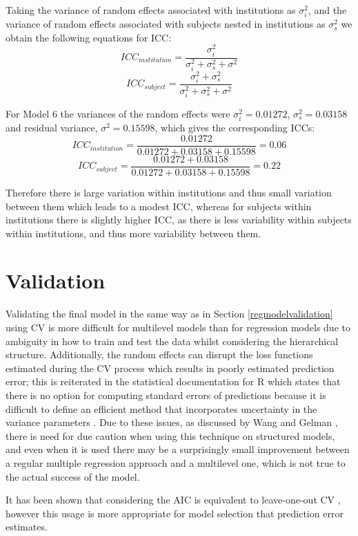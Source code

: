 \documentclass[11pt,a4paper]{report}
\begin{document}
Taking the variance of random effects associated with institutions as $\sigma^{2}_i$, and the variance of random effects associated with subjects nested in institutions as $\sigma^{2}_s$ we obtain the following equations for ICC: 
\[ICC_{institution} = \frac{\sigma^{2}_i}{\sigma^{2}_i + \sigma^{2}_s + \sigma^{2}} \]
\[ICC_{subject} = \frac{\sigma^{2}_i + \sigma^{2}_s}{\sigma^{2}_i + \sigma^{2}_s + \sigma^{2}} \]

For Model 6 the variances of the random effects were $\sigma^{2}_i = 0.01272$, $\sigma^{2}_s = 0.03158$ and residual variance, $\sigma^{2} = 0.15598$, which gives the corresponding ICCs:
\[ICC_{institution} = \frac{0.01272}{0.01272 + 0.03158 + 0.15598} = 0.06 \] 
\[ICC_{subject} = \frac{0.01272 + 0.03158}{0.01272 + 0.03158 + 0.15598} = 0.22\]

Therefore there is large variation within institutions and thus small variation between them which leads to a modest ICC, whereas for subjects within institutions there is slightly higher ICC, as there is less variability within subjects within institutions, and thus more variability between them. 
 

\section{Validation}
Validating the final model in the same way as in Section \ref{regmodelvalidation} using CV is more difficult for multilevel models than for regression models due to ambiguity in how to train and test the data whilst considering the hierarchical structure. Additionally, the random effects can disrupt the loss functions estimated during the CV process which results in poorly estimated prediction error; this is reiterated in the statistical documentation for R which states that there is no option for computing standard errors of predictions because it is difficult to define an efficient method that incorporates uncertainty in the variance parameters \cite{R_lme4}. Due to these issues, as discussed by Wang and Gelman \cite{wang2014difficulty}, there is need for due caution when using this technique on structured models, and even when it is used there may be a surprisingly small improvement between a regular multiple regression approach and a multilevel one, which is not true to the actual success of the model.

It has been shown that considering the \ac{AIC} is equivalent to leave-one-out CV \cite{fang2011asymptotic, stone1977asymptotic}, however this usage is more appropriate for model selection that prediction error estimates. 
\end{document}
